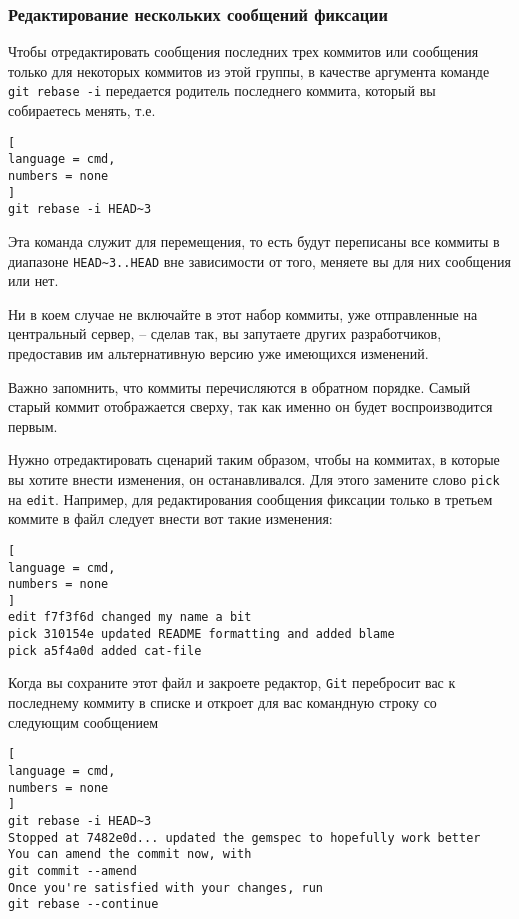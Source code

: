 \documentclass[%
	11pt,
	a4paper,
	utf8,
		]{article}
\begin{document}
\subsubsection{Редактирование нескольких сообщений фиксации}

Чтобы отредактировать сообщения последних трех коммитов или сообщения только для некоторых коммитов из этой группы, в качестве аргумента команде \texttt{git rebase -i} передается родитель последнего коммита, который вы собираетесь менять, т.е.

\begin{lstlisting}[
language = cmd,
numbers = none
]
git rebase -i HEAD~3
\end{lstlisting}

Эта команда служит для перемещения, то есть будут переписаны все коммиты в диапазоне \lstinline{HEAD~3..HEAD} вне зависимости от того, меняете вы для них сообщения или нет.

Ни в коем случае не включайте в этот набор коммиты, уже отправленные на центральный сервер, -- сделав так, вы запутаете других разработчиков, предоставив им альтернативную версию уже имеющихся изменений.

Важно запомнить, что коммиты перечисляются в обратном порядке. Самый старый коммит отображается сверху, так как именно он будет воспроизводится первым.

Нужно отредактировать сценарий таким образом, чтобы на коммитах, в которые вы хотите внести изменения, он останавливался. Для этого замените слово \texttt{pick} на \texttt{edit}. Например, для редактирования сообщения фиксации только в третьем коммите в файл следует внести вот такие изменения:

\begin{lstlisting}[
language = cmd,
numbers = none
]
edit f7f3f6d changed my name a bit
pick 310154e updated README formatting and added blame
pick a5f4a0d added cat-file
\end{lstlisting}

Когда вы сохраните этот файл и закроете редактор, \texttt{Git} перебросит вас к последнему коммиту в списке и откроет для вас командную строку со следующим сообщением

\begin{lstlisting}[
language = cmd,
numbers = none
]
git rebase -i HEAD~3
Stopped at 7482e0d... updated the gemspec to hopefully work better
You can amend the commit now, with 
git commit --amend
Once you're satisfied with your changes, run
git rebase --continue
\end{lstlisting}
\end{document}
